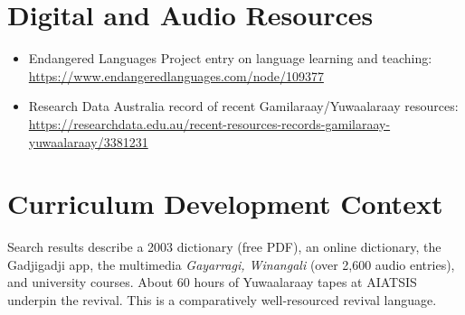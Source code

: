 \documentclass[12pt]{article}
\begin{document}
\section{Digital and Audio Resources}
\begin{itemize}
\item Endangered Languages Project entry on language learning and teaching: \url{https://www.endangeredlanguages.com/node/109377}
\item Research Data Australia record of recent Gamilaraay/Yuwaalaraay resources: \url{https://researchdata.edu.au/recent-resources-records-gamilaraay-yuwaalaraay/3381231}
\end{itemize}

\section{Curriculum Development Context}
Search results describe a 2003 dictionary (free PDF), an online dictionary, the Gadjigadji app, the multimedia \emph{Gayarragi, Winangali} (over 2,600 audio entries), and university courses. About 60 hours of Yuwaalaraay tapes at AIATSIS underpin the revival. This is a comparatively well-resourced revival language.
\end{document}
